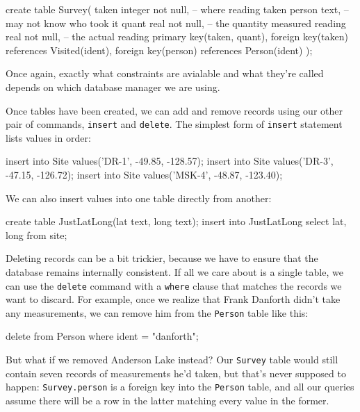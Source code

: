 \documentclass{book}
\begin{document}
\begin{VerbIn}
create table Survey(
    taken   integer not null, -- where reading taken
    person  text,             -- may not know who took it
    quant   real not null,    -- the quantity measured
    reading real not null,    -- the actual reading
    primary key(taken, quant),
    foreign key(taken) references Visited(ident),
    foreign key(person) references Person(ident)
);
\end{VerbIn}

Once again, exactly what constraints are avialable and what they're
called depends on which database manager we are using.

Once tables have been created, we can add and remove records using our
other pair of commands, \texttt{insert} and \texttt{delete}. The
simplest form of \texttt{insert} statement lists values in order:

\begin{VerbIn}
insert into Site values('DR-1', -49.85, -128.57);
insert into Site values('DR-3', -47.15, -126.72);
insert into Site values('MSK-4', -48.87, -123.40);
\end{VerbIn}

We can also insert values into one table directly from another:

\begin{VerbIn}
create table JustLatLong(lat text, long text);
insert into JustLatLong select lat, long from site;
\end{VerbIn}

Deleting records can be a bit trickier, because we have to ensure that
the database remains internally consistent. If all we care about is a
single table, we can use the \texttt{delete} command with a
\texttt{where} clause that matches the records we want to discard. For
example, once we realize that Frank Danforth didn't take any
measurements, we can remove him from the \texttt{Person} table like
this:

\begin{VerbIn}
delete from Person where ident = "danforth";
\end{VerbIn}

But what if we removed Anderson Lake instead? Our \texttt{Survey} table
would still contain seven records of measurements he'd taken, but that's
never supposed to happen: \texttt{Survey.person} is a foreign key into
the \texttt{Person} table, and all our queries assume there will be a
row in the latter matching every value in the former.
\end{document}
